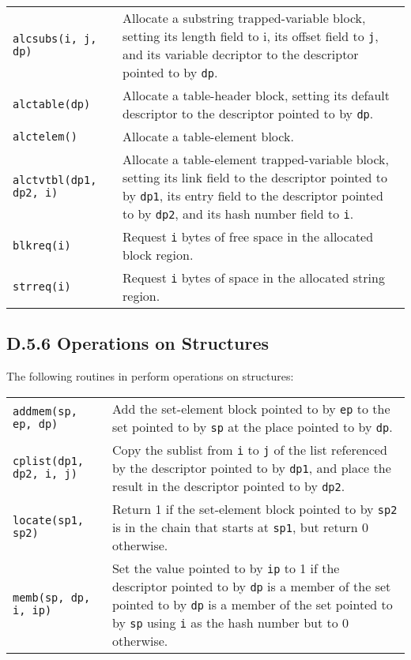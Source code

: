 {\begin{xtabular}{>{\hspace{1cm}\texttt\bgroup}l<{\egroup}@{\hspace{1cm}}p{11cm}}
alcsubs(i, j, dp) &
Allocate a substring trapped-variable block, setting its length field to
i, its offset field to \texttt{j}, and its variable decriptor to the
descriptor pointed to by \texttt{dp}.\\

alctable(dp) &
Allocate a table-header block, setting its default descriptor to the descriptor
pointed to by \texttt{dp}.\\

alctelem() &
Allocate a table-element block.\\

alctvtbl(dp1, dp2, i) &
Allocate a table-element trapped-variable block, setting its link field to the
descriptor pointed to by \texttt{dp1}, its entry field to the descriptor pointed
to by \texttt{dp2}, and its hash number field to \texttt{i}.\\

blkreq(i) &
Request \texttt{i} bytes of free space in the allocated block region.\\

\texttt{strreq(i)} &
Request \texttt{i} bytes of space in the allocated string region.\\

\end{xtabular}
}

\subsection[D.5.6 Operations on Structures]{D.5.6 Operations on Structures}

The following routines in  perform operations on structures:

\begin{xtabular}{l@{\hspace{1cm}}p{11cm}}

\texttt{addmem(sp, ep, dp)} &
Add the set-element block pointed to by \texttt{ep} to the set pointed to by
\texttt{sp} at the place pointed to by \texttt{dp}.\\

\texttt{cplist(dp1, dp2, i, j)} &
Copy the sublist from \texttt{i} to \texttt{j} of the list referenced by the
descriptor pointed to by \texttt{dp1}, and place the result in the descriptor
pointed to by \texttt{dp2}.\\

\texttt{{\color{red}locate}(sp1, sp2)} &
Return 1 if the set-element block pointed to by \texttt{sp2} is in the chain
that starts at \texttt{sp1}, but return 0 otherwise.\\

\texttt{memb(sp, dp, i, ip)} &
Set the value pointed to by \texttt{ip} to 1 if the descriptor pointed to by
\texttt{dp} is a member of the set pointed to by \texttt{dp} is a member of the
set pointed to by \texttt{sp} using \texttt{i} as the hash number but to 0
otherwise.\\

\end{xtabular}

